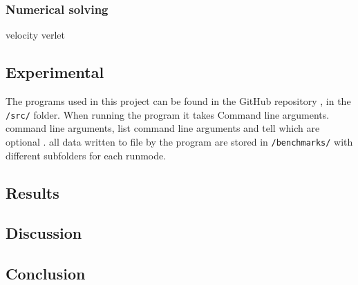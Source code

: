 \documentclass{article}
\newcommand{\husk}[1]{\color{red} #1 \color{black}}
\begin{document}
\subsubsection{Numerical solving}
velocity verlet
\subsection{Experimental}
The programs used in this project can be found in the GitHub repository \cite{GitHub}, in the \texttt{/src/} folder. When running the program it takes \husk{Command line arguments.} command line arguments, \husk{list command line arguments and tell which are optional}. all data written to file by the program are stored in \texttt{/benchmarks/} with different subfolders for each runmode.
\subsection{Results}
\subsection{Discussion}
\subsection{Conclusion}

\end{document}
